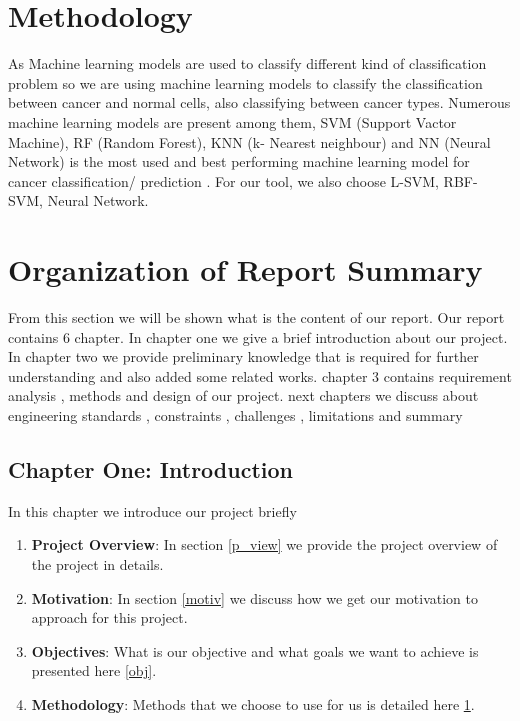\section{Methodology}
\label{methodo}
As Machine learning models are used to classify different kind of classification problem so we are using machine learning models to classify the classification between cancer and normal cells, also classifying between cancer types. Numerous machine learning models are present among them, SVM (Support Vactor Machine), RF (Random Forest), KNN (k- Nearest neighbour) and NN (Neural Network) is the most used and best performing machine learning model for cancer classification/ prediction \cite{pmid30049182}. For our tool, we also choose L-SVM, RBF-SVM, Neural Network.    
\section{Organization of Report Summary}
\label{org_rep}
From this section we will be shown what is the content of our report. Our report contains 6 chapter. In chapter one we give a brief introduction about our project. In chapter two we provide preliminary knowledge that is required for further understanding and also added some related works. chapter 3 contains requirement analysis , methods and design of our project. next chapters we discuss about engineering standards , constraints , challenges , limitations and summary
\subsection{Chapter One: Introduction}
In this chapter we introduce our project briefly
\begin{enumerate}
  \item \textbf{Project Overview}: In section \ref{p_view} we provide the project overview of the project in details.
  \item \textbf{Motivation}: In section \ref{motiv} we discuss how we get our motivation to approach for this project.
  \item \textbf{Objectives}: What is our objective and what goals we want to achieve is presented here \ref{obj}.
  \item \textbf{Methodology}: Methods that we choose to use for us is detailed here \ref{methodo}.
\end{enumerate}

